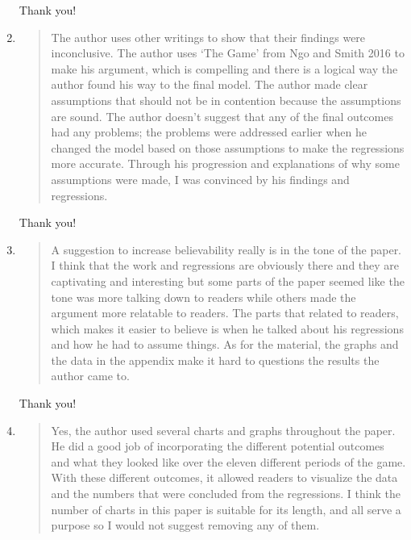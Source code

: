 \documentclass{article}
\newenvironment{itquote}
	{\begin{quote}\itshape}
	{\end{quote}\ignorespacesafterend}
\begin{document}
\begin{enumerate}
				Thank you!

			\item
				
				\begin{itquote}
			
					The author uses other writings to show that their findings were inconclusive. The author uses ‘The Game' from Ngo and Smith 2016 to make his argument, which is compelling and there is a logical way the author found his way to the final model. The author made clear assumptions that should not be in contention because the assumptions are sound. The author doesn't suggest that any of the final outcomes had any problems; the problems were addressed earlier when he changed the model based on those assumptions to make the regressions more accurate. Through his progression and explanations of why some assumptions were made, I was convinced by his findings and regressions.

				\end{itquote}

				Thank you!

			\item
				
				\begin{itquote}
			
					A suggestion to increase believability really is in the tone of the paper. I think that the work and regressions are obviously there and they are captivating and interesting but some parts of the paper seemed like the tone was more talking down to readers while others made the argument more relatable to readers. The parts that related to readers, which makes it easier to believe is when he talked about his regressions and how he had to assume things. As for the material, the graphs and the data in the appendix make it hard to questions the results the author came to.

				\end{itquote}

				Thank you!

			\item

				\begin{itquote}
			
					Yes, the author used several charts and graphs throughout the paper. He did a good job of incorporating the different potential outcomes and what they looked like over the eleven different periods of the game. With these different outcomes, it allowed readers to visualize the data and the numbers that were concluded from the regressions. I think the number of charts in this paper is suitable for its length, and all serve a purpose so I would not suggest removing any of them.


\end{itquote}
\end{enumerate}
\end{document}
